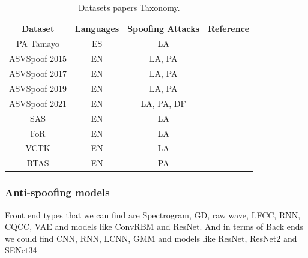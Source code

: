 \begin{table}[h]
\centering
    \begin{tabular}{| c | c | c | c |} 
         \hline
         \textbf{Dataset} & \textbf{Languages} & \textbf{Spoofing Attacks} & \textbf{Reference} \\ [0.5ex] 
         \hline
         \hline
         PA Tamayo &  \acs{ES} & \acs{LA} & \cite{wang2022practical} \\ 
         \hline
         ASVSpoof 2015 & \acs{EN} & \acs{LA}, \acs{PA} & \cite{tamayo2022voice} \\ 
         \hline
         ASVSpoof 2017 & \acs{EN} & \acs{LA}, \acs{PA} & \cite{kinnunen17_interspeech} \\ 
         \hline
         ASVSpoof 2019 & \acs{EN} & \acs{LA}, \acs{PA} & \cite{yamagishi2019asvspoof} \\
         \hline
         ASVSpoof 2021 & \acs{EN} & \acs{LA}, \acs{PA}, \acs{DF} & \cite{delgado2021asvspoof} \\ 
         \hline
         SAS & \acs{EN} & \acs{LA} & \cite{wu2016anti} \\
         \hline
         FoR & \acs{EN} & \acs{LA} & \cite{reimao2019dataset} \\
         \hline
         VCTK & \acs{EN} & \acs{LA} & \cite{yamagishi2019cstr} \\
         \hline
         BTAS & \acs{EN} & \ac{PA} & \cite{korshunov2016overview} \\
         \hline
    \end{tabular}
    \caption{Datasets papers Taxonomy.}
    \label{table:datasets-taxonomy}
\end{table}

\subsubsection{Anti-spoofing models}

Front end types that we can find are Spectrogram, \ac{GD}, raw wave, \ac{LFCC}, \ac{RNN}, \ac{CQCC}, \ac{VAE} and models like ConvRBM and ResNet. And in terms of Back ends we could find \ac{CNN}, \ac{RNN}, \ac{LCNN}, \ac{GMM} and models like ResNet, ResNet2 and SENet34


